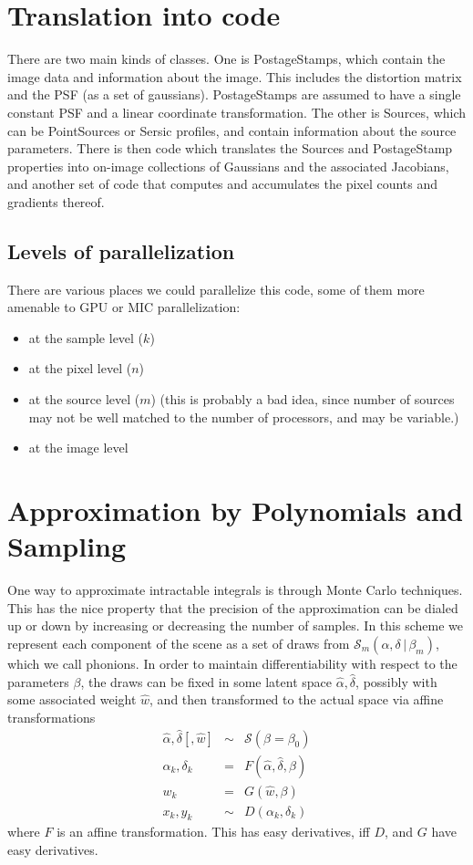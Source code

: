 \documentclass[modern]{aastex6}
\newcommand{\given}{\,|\,}
\newcommand{\scene}{\mathcal{S}}
\begin{document}
\section{Translation into code}
There are two main kinds of classes.
One is PostageStamps, which contain the image data and information about the image.
This includes the distortion matrix and the PSF (as a set of gaussians).
PostageStamps are assumed to have a single constant PSF and a linear coordinate transformation.
 The other is Sources, which can be PointSources or Sersic profiles, and contain information about the source parameters.
There is then code which translates the Sources and PostageStamp properties into on-image collections of Gaussians and the associated Jacobians, 
and another set of code that computes and accumulates the pixel counts and gradients thereof.

\subsection{Levels of parallelization}
There are various places we could parallelize this code, 
some of them more amenable to GPU or MIC parallelization:
\begin{itemize}

\item at the sample level ($k$)

\item at the pixel level ($n$)

\item at the source level ($m$) (this is probably a bad idea, since number of sources may not be well matched to the number of processors, and may be variable.)

\item at the image level
\end{itemize}


\section{Approximation by Polynomials and Sampling}
One way to approximate intractable integrals is through Monte Carlo techniques.
This has the nice property that the precision of the approximation can be dialed up or down by increasing or decreasing the number of samples.
In this scheme we represent each component of the scene as a set of draws from $\scene_m(\alpha, \delta \given \beta_m)$, which we call phonions.
In order to maintain differentiability with respect to the parameters $\beta$, the draws can be fixed in some latent space $\hat{\alpha}, \hat{\delta}$,
possibly with some associated weight $\hat{w}$,
and then transformed to the actual space via affine transformations
\begin{eqnarray}
\hat{\alpha}, \hat{\delta} [, \hat{w}] & \sim & \scene(\beta=\beta_0) \\
\alpha_k, \delta_k & = & F(\hat{\alpha}, \hat{\delta}, \beta) \nonumber \\
w_k & = & G(\hat{w}, \beta) \nonumber \\
x_k, y_k & \sim & D(\alpha_k, \delta_k) \nonumber
\end{eqnarray}
where $F$ is an affine transformation. This has easy derivatives, iff $D$, and $G$ have easy derivatives.
\end{document}
